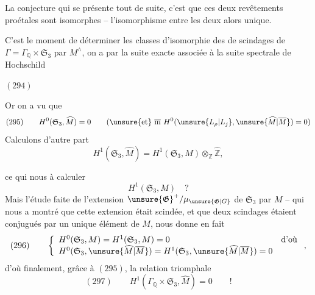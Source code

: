 La conjecture qui se présente tout de suite, c'est que ces deux revêtements proétales sont isomorphes -- l'isomorphisme entre les deux  alors unique.


 C'est le moment de déterminer les classes d'isomorphie des  de scindages de  $\Gamma=\Gamma_{\mathbb Q}\times\mathfrak S_3$ par $M^{\wedge}$, on a par la suite exacte associée à la suite spectrale de Hochschild

$(294)$\quad
{}

Or on a vu que
\[
(295)\qquad H^0(\mathfrak S_3,\widehat M)=0
\qquad(\text{\unsure{et} }\overline{\mathrm m}\ H^0(\unsure{L_\rho|L_j},\unsure{\widehat M|\overline M})=0)
\]
 Calculons d'autre part
\[
H^1(\mathfrak S_3,\widehat M)=H^1(\mathfrak S_3,M)\otimes_{\mathbb Z}\widehat{\mathbb Z},
\]



ce qui nous  à calculer
\[
H^1(\mathfrak S_3,M)\quad ?
\]
Mais l'étude faite de l'extension $\unsure{\mathfrak G}^+/\mu_{\unsure{\mathfrak G|G}}$ de $\mathfrak S_3$ par $M$ -- qui nous a montré que cette extension était scindée, et que deux scindages étaient conjugués par un unique élément de $M$, nous donne en fait
\[
(296)\qquad
\left\{\begin{array}{ll}
H^0(\mathfrak S_3,M)=H^1(\mathfrak S_3,M)=0&\text{d'où}\\
H^0(\mathfrak S_3,\unsure{\widehat M|\overline M})=H^1(\mathfrak S_3,\unsure{\widehat M|\overline M})=0&
\end{array}\right.
,
\]
d'où finalement, grâce à $(295)$, la relation triomphale
\[
(297)\qquad\boxed{H^1(\Gamma_{\mathbb Q}\times\mathfrak S_3,\widehat M)=0}\qquad !
\]

